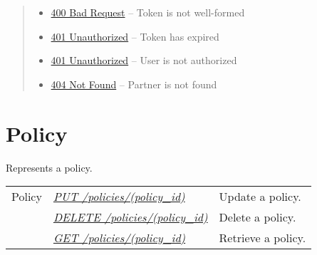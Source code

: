 \documentclass[letterpaper,10pt,english]{sphinxmanual}
\begin{document}
\begin{fulllineitems}
\begin{quote}
\begin{description}
\begin{itemize}
\item {} 
\href{http://www.w3.org/Protocols/rfc2616/rfc2616-sec10.html\#sec10.4.1}{400 Bad Request} -- Token is not well-formed

\item {} 
\href{http://www.w3.org/Protocols/rfc2616/rfc2616-sec10.html\#sec10.4.2}{401 Unauthorized} -- Token has expired

\item {} 
\href{http://www.w3.org/Protocols/rfc2616/rfc2616-sec10.html\#sec10.4.2}{401 Unauthorized} -- User is not authorized

\item {} 
\href{http://www.w3.org/Protocols/rfc2616/rfc2616-sec10.html\#sec10.4.5}{404 Not Found} -- Partner is not found

\end{itemize}

\end{description}\end{quote}

\end{fulllineitems}



\section{Policy}
\label{\detokenize{resources/policy::doc}}\label{\detokenize{resources/policy:policy}}\label{\detokenize{resources/policy:id1}}
Represents a policy.

\noindent\begin{tabulary}{\linewidth}{|L|L|L|}
\hline
{}\relax &\relax &\relax \\
\hline
Policy
&
{\hyperref[\detokenize{resources/policy:put--policies-(policy_id)}]{\emph{PUT /policies/(policy\_id)}}}
&
Update a policy.
\\
\hline&
{\hyperref[\detokenize{resources/policy:delete--policies-(policy_id)}]{\emph{DELETE /policies/(policy\_id)}}}
&
Delete a policy.
\\
\hline&
{\hyperref[\detokenize{resources/policy:get--policies-(policy_id)}]{\emph{GET /policies/(policy\_id)}}}
&
Retrieve a policy.
\\
\hline\end{tabulary}


\begin{DUlineblock}{0em}
\item[] 
\end{DUlineblock}
\end{document}

